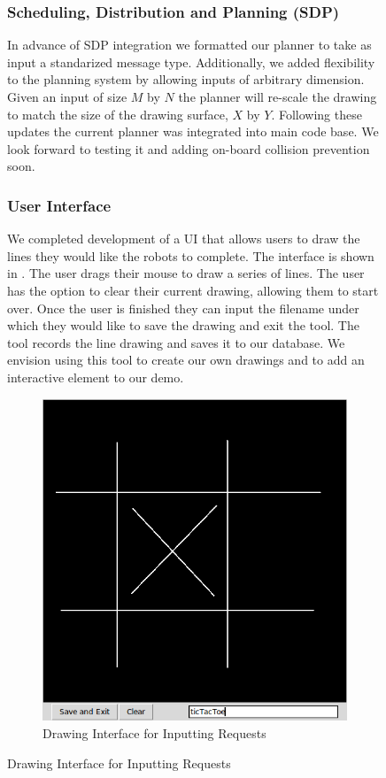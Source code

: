 \begin{figure}[h!]
\subsubsection{Scheduling, Distribution and Planning (SDP)}
In advance of SDP integration we formatted our planner to take as input a standarized message type. Additionally, we added flexibility to the planning system by allowing inputs of arbitrary dimension. Given an input of size $M$ by $N$ the planner will re-scale the drawing to match the size of the drawing surface, $X$ by $Y$. Following these updates the current planner was integrated into main code base. We look forward to testing it and adding on-board collision prevention soon.  

\subsubsection{User Interface}
We completed development of a UI that allows users to draw the lines they would like the robots to complete. The interface is shown in . The user drags their mouse to draw a series of lines. The user has the option to clear their current drawing, allowing them to start over. Once the user is finished they can input the filename under which they would like to save the drawing and exit the tool. The tool records the line drawing and saves it to our database. We envision using this tool to create our own drawings and to add an interactive element to our demo.   

\begin{figure}[h!]
\centering
\includegraphics[width=0.49\columnwidth]{figs/drawingInterface.png}
\caption{Drawing Interface for Inputting Requests}
\label{fig:drawing_interface}
\end{figure}


\end{figure}
